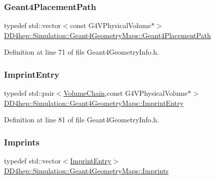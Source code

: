 \subsubsection{\texorpdfstring{Geant4\+Placement\+Path}{Geant4PlacementPath}}
{\footnotesize\ttfamily typedef std\+::vector$<$const G4\+V\+Physical\+Volume$\ast$$>$ \hyperlink{namespace_d_d4hep_1_1_simulation_1_1_geant4_geometry_maps_a8a325934adb143cb1cbc47dd030395ed}{D\+D4hep\+::\+Simulation\+::\+Geant4\+Geometry\+Maps\+::\+Geant4\+Placement\+Path}}



Definition at line 71 of file Geant4\+Geometry\+Info.\+h.

\hypertarget{namespace_d_d4hep_1_1_simulation_1_1_geant4_geometry_maps_ab7b5bc15fa7417d422647be899d10c88}{}\label{namespace_d_d4hep_1_1_simulation_1_1_geant4_geometry_maps_ab7b5bc15fa7417d422647be899d10c88} 
\subsubsection{\texorpdfstring{Imprint\+Entry}{ImprintEntry}}
{\footnotesize\ttfamily typedef std\+::pair$<$\hyperlink{namespace_d_d4hep_1_1_simulation_1_1_geant4_geometry_maps_a23aa6ab8c70ef8f0c800d00db6a7bb53}{Volume\+Chain},const G4\+V\+Physical\+Volume$\ast$$>$ \hyperlink{namespace_d_d4hep_1_1_simulation_1_1_geant4_geometry_maps_ab7b5bc15fa7417d422647be899d10c88}{D\+D4hep\+::\+Simulation\+::\+Geant4\+Geometry\+Maps\+::\+Imprint\+Entry}}



Definition at line 81 of file Geant4\+Geometry\+Info.\+h.

\hypertarget{namespace_d_d4hep_1_1_simulation_1_1_geant4_geometry_maps_a44385b9a0b879f5b5a4f11c606cbd968}{}\label{namespace_d_d4hep_1_1_simulation_1_1_geant4_geometry_maps_a44385b9a0b879f5b5a4f11c606cbd968} 
\subsubsection{\texorpdfstring{Imprints}{Imprints}}
{\footnotesize\ttfamily typedef std\+::vector$<$\hyperlink{namespace_d_d4hep_1_1_simulation_1_1_geant4_geometry_maps_ab7b5bc15fa7417d422647be899d10c88}{Imprint\+Entry}$>$ \hyperlink{namespace_d_d4hep_1_1_simulation_1_1_geant4_geometry_maps_a44385b9a0b879f5b5a4f11c606cbd968}{D\+D4hep\+::\+Simulation\+::\+Geant4\+Geometry\+Maps\+::\+Imprints}}



